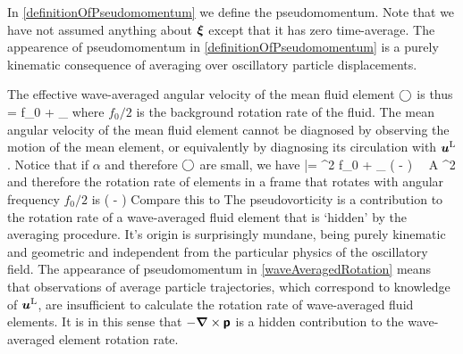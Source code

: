 \documentclass[12pt, oneside]{book}
\begin{document}
In \eqref{definitionOfPseudomomentum} we define the pseudomomentum.  Note that we have not assumed anything about $\boldsymbol {\xi}$ except that it has zero time-average.  The appearence of pseudomomentum in \eqref{definitionOfPseudomomentum} is a purely kinematic consequence of averaging over oscillatory particle displacements. 

The effective wave-averaged angular velocity of the mean fluid element $\bigcirc$ is thus
\beq
{} = \half f_0 +  \oint_{\meanc} \left [ \buL - \sbp \right ] \bcdot \id \bx \com
\eeq
where $f_0/2$ is the background rotation rate of the fluid.  The mean angular velocity of the mean fluid element cannot be diagnosed by observing the motion of the mean element, or equivalently by diagnosing its circulation with $\boldsymbol{u}^{\mathrm{L}}$.  Notice that if $\alpha$ and therefore $\bigcirc$ are small, we have 
\beq
\bar \Gamma = \pi \alpha^2 f_0 + \int_{\meanc} \bnabla \times \left ( \buL - \sbp \right ) \bcdot \, \bnh \, \id A \approx \pi \alpha^2  \com
\eeq
and therefore the rotation rate of elements in a frame that rotates with angular frequency $f_0/2$ is
\beq
{} \approx \half \bnh \bcdot \bnabla \times \left ( \buL - \sbp \right )  \per
\label{waveAveragedRotation}
\eeq
Compare this to
\beq
{} \approx \half \bnh \bcdot \bnabla \times \bu \per
\eeq
The pseudovorticity is a contribution to the rotation rate of a wave-averaged fluid element that is `hidden' by the averaging procedure.  It's origin is surprisingly mundane, being purely kinematic and geometric and independent from the particular physics of the oscillatory field.  The appearance of pseudomomentum in \eqref{waveAveragedRotation} means that observations of average particle trajectories, which correspond to knowledge of $\boldsymbol{u}^{\mathrm{L}}$, are insufficient to calculate the rotation rate of wave-averaged fluid elements.  It is in this sense that $-\boldsymbol \nabla \times \boldsymbol{\mathsf{p}}$ is a hidden contribution to the wave-averaged element rotation rate. 
\end{document}
